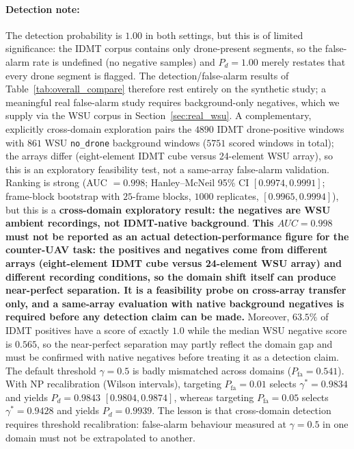 \documentclass[5p,twocolumn]{elsarticle}
\begin{document}
\paragraph{Detection note:}
The detection probability is $1.00$ in both settings, but this is of limited significance: the IDMT corpus contains only drone-present segments, so the false-alarm rate is undefined (no negative samples) and $P_d=1.00$ merely restates that every drone segment is flagged. The detection/false-alarm results of Table~\ref{tab:overall_compare} therefore rest entirely on the synthetic study; a meaningful real false-alarm study requires background-only negatives, which we supply via the WSU corpus in Section~\ref{sec:real_wsu}. A complementary, explicitly cross-domain exploration pairs the $4890$ IDMT drone-positive windows with $861$ WSU \texttt{no\_drone} background windows ($5751$ scored windows in total); the arrays differ (eight-element IDMT cube versus 24-element WSU array), so this is an exploratory feasibility test, not a same-array false-alarm validation. Ranking is strong (AUC $=0.998$; Hanley--McNeil 95\% CI $[0.9974, 0.9991]$; frame-block bootstrap with $25$-frame blocks, $1000$ replicates, $[0.9965, 0.9994]$), but this is a \textbf{cross-domain exploratory result: the negatives are WSU ambient recordings, not IDMT-native background}. \textbf{This $AUC=0.998$ must not be reported as an actual detection-performance figure for the counter-UAV task: the positives and negatives come from different arrays (eight-element IDMT cube versus 24-element WSU array) and different recording conditions, so the domain shift itself can produce near-perfect separation. It is a feasibility probe on cross-array transfer only, and a same-array evaluation with native background negatives is required before any detection claim can be made.} Moreover, $63.5\%$ of IDMT positives have a score of exactly $1.0$ while the median WSU negative score is $0.565$, so the near-perfect separation may partly reflect the domain gap and must be confirmed with native negatives before treating it as a detection claim. The default threshold $\gamma=0.5$ is badly mismatched across domains ($P_{\mathrm{fa}}=0.541$). With NP recalibration (Wilson intervals), targeting $P_{\mathrm{fa}}=0.01$ selects $\gamma^*=0.9834$ and yields $P_d=0.9843$ $[0.9804,0.9874]$, whereas targeting $P_{\mathrm{fa}}=0.05$ selects $\gamma^*=0.9428$ and yields $P_d=0.9939$. The lesson is that cross-domain detection requires threshold recalibration: false-alarm behaviour measured at $\gamma=0.5$ in one domain must not be extrapolated to another.
\end{document}
